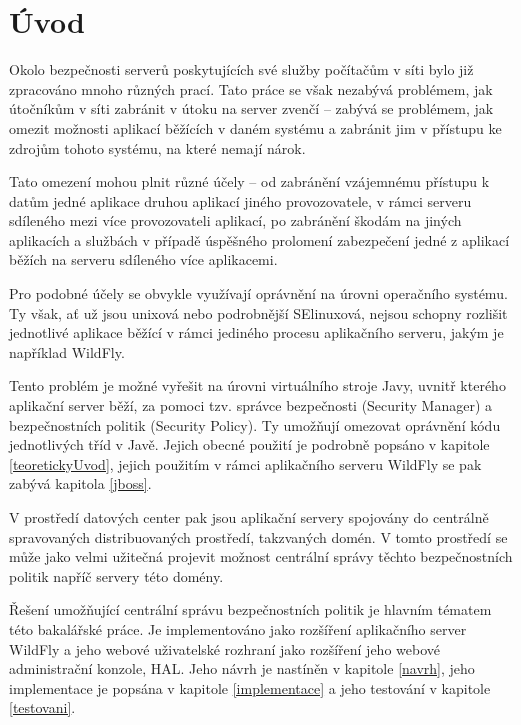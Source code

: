 
\chapter{Úvod} \label{uplnyUvod}

Okolo bezpečnosti serverů poskytujících své služby počítačům v síti bylo již zpracováno mnoho různých prací.
Tato práce se však nezabývá problémem, jak útočníkům v síti zabránit v útoku na server zvenčí -- zabývá se problémem,
jak omezit možnosti aplikací běžících v daném systému a zabránit jim v přístupu ke zdrojům tohoto systému,
na které nemají nárok.

Tato omezení mohou plnit různé účely -- od zabránění vzájemnému přístupu k datům jedné aplikace druhou aplikací jiného provozovatele,
v rámci serveru sdíleného mezi více provozovateli aplikací, po zabránění škodám na jiných aplikacích a službách v případě úspěšného prolomení
zabezpečení jedné z aplikací běžích na serveru sdíleného více aplikacemi.

Pro podobné účely se obvykle využívají oprávnění na úrovni operačního systému. Ty však, ať už jsou unixová nebo podrobnější SElinuxová,
nejsou schopny rozlišit jednotlivé aplikace běžící v rámci jediného procesu aplikačního serveru, jakým je například WildFly.

Tento problém je možné vyřešit na úrovni virtuálního stroje Javy, uvnitř kterého aplikační server běží, za pomoci tzv. správce bezpečnosti (Security Manager)
a bezpečnostních politik (Security Policy). Ty umožňují omezovat oprávnění kódu jednotlivých tříd v Javě.
Jejich obecné použití je podrobně popsáno v kapitole \ref{teoretickyUvod}, jejich použitím v rámci aplikačního serveru WildFly se pak zabývá kapitola \ref{jboss}.

V prostředí datových center pak jsou aplikační servery spojovány do centrálně spravovaných distribuovaných prostředí, takzvaných domén.
V tomto prostředí se může jako velmi užitečná projevit možnost centrální správy těchto bezpečnostních politik napříč servery této domény.

Řešení umožňující centrální správu bezpečnostních politik je hlavním tématem této bakalářské práce.
Je implementováno jako rozšíření aplikačního server WildFly a jeho webové uživatelské rozhraní jako rozšíření jeho webové administrační konzole, HAL.
Jeho návrh je nastíněn v kapitole \ref{navrh}, jeho implementace je popsána v kapitole \ref{implementace} a jeho testování v kapitole \ref{testovani}.

